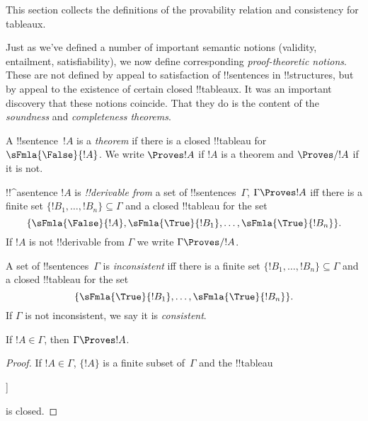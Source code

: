\documentclass[../../../include/open-logic-section]{subfiles}
\begin{document}
      {}
      {}

\begin{editorial}
This section collects the definitions of the provability relation
and consistency for tableaux.
\end{editorial}

\begin{explain}
Just as we've defined a number of important semantic notions
(validity, entailment, satisfiability), we now define corresponding
\emph{proof-theoretic notions}.  These are not defined by appeal to
satisfaction of !!{sentence}s in !!{structure}s, but by appeal to the
existence of certain closed !!{tableau}x.  It was an important
discovery that these notions coincide.  That they do is the content of
the \emph{soundness} and \emph{completeness theorems}.
\end{explain}


\begin{defn}[Theorems]
A !!{sentence}~$!A$ is a \emph{theorem} if there is a closed
!!{tableau} for~$\sFmla{\False}{!A}$.  We write $\Proves !A$ if $!A$
is a theorem and $\Proves/ !A$ if it is not.
\end{defn}

\begin{defn}[!!^{derivability}]
!!^a{sentence} $!A$ is \emph{!!{derivable} from} a set of
!!{sentence}s~$\Gamma$, $\Gamma \Proves !A$ iff there is a
finite set $\{!B_1, \dots, !B_n\} \subseteq \Gamma$
and a closed !!{tableau} for the set
\[
\{
  \sFmla{\False}{!A},
  \sFmla{\True}{!B_1}, \dots,
  \sFmla{\True}{!B_n}
  \}.
\]
If $!A$ is not !!{derivable} from $\Gamma$ we write $\Gamma \Proves/
!A$.
\end{defn}

\begin{defn}[Consistency]
A set of !!{sentence}s~$\Gamma$ is \emph{inconsistent} iff there is a
finite set $\{!B_1, \dots, !B_n\} \subseteq \Gamma$ and a closed
!!{tableau} for the set
\[
\{
  \sFmla{\True}{!B_1}, \dots,
  \sFmla{\True}{!B_n}  
  \}.
\]
If $\Gamma$ is not inconsistent, we say it is \emph{consistent}.
\end{defn}

\begin{prop}[Reflexivity]
If $!A \in \Gamma$, then $\Gamma \Proves !A$.
\end{prop}

\begin{proof}
If $!A \in \Gamma$, $\{!A\}$ is a finite subset of~$\Gamma$ and the !!{tableau}
\begin{oltableau}
  [\sFmla{\False}{\formula{A}}, just = \TAss
    [\sFmla{\True}{\formula{A}}, just = \TAss,close]
  ]
\end{oltableau}
is closed.
\end{proof}
  
\end{document}
